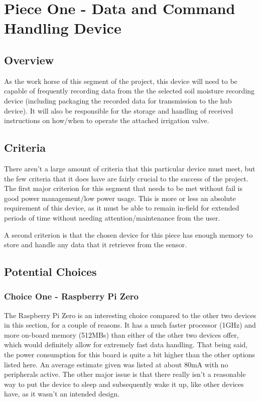 \documentclass[onecolumn, draftclsnofoot,10pt, compsoc]{IEEEtran}
\begin{document}
    \section{Piece One - Data and Command Handling Device}
    \subsection{Overview}
    As the work horse of this segment of the project, this device will need to be capable of frequently recording data from the the selected soil moisture recording device (including packaging the recorded data for transmission to the hub device).
    It will also be responsible for the storage and handling of received instructions on how/when to operate the attached irrigation valve.
    \subsection{Criteria}
    There aren't a large amount of criteria that this particular device must meet, but the few criteria that it does have are fairly crucial to the success of the project.
    The first major criterion for this segment that needs to be met without fail is good power management/low power usage. This is more or less an absolute requirement of this device, as it must be able to remain in-field for extended periods of time without needing attention/maintenance from the user.\par
    A second criterion is that the chosen device for this piece has enough memory to store and handle any data that it retrieves from the sensor.
    
    \subsection{Potential Choices}
    \subsubsection{Choice One - Raspberry Pi Zero}
    The Raspberry Pi Zero is an interesting choice compared to the other two devices in this section, for a couple of reasons.
    It has a much faster processor (1GHz) and more on-board memory (512MBs) than either of the other two devices offer, which would definitely allow for extremely fast data handling.
    That being said, the power consumption for this board is quite a bit higher than the other options listed here.
    An average estimate given was listed at about 80mA with no peripherals active.\cite{rpi_power}
    The other major issue is that there really isn't a reasonable way to put the device to sleep and subsequently wake it up, like other devices have, as it wasn't an intended design.
\end{document}
